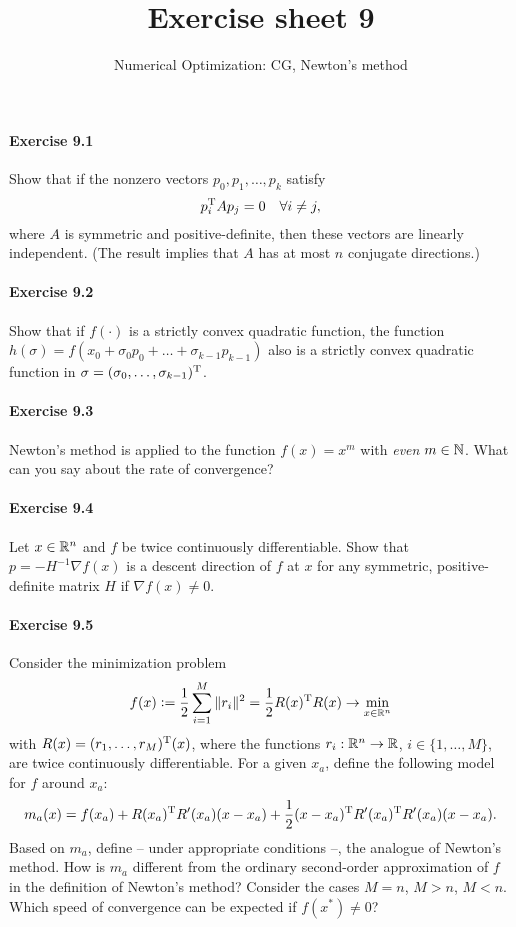 
\title{Exercise sheet 9}
\subtitle{Numerical Optimization: CG, Newton's method}

\maketitle

\paragraph{Exercise 9.1}  %
Show that if the nonzero vectors $p_0, p_1,\dots, p_k$ satisfy
\[
  p_i^{\text{\upshape T}} A p_j = 0 \quad\forall i\neq j,
\]
where $A$ is symmetric and positive-definite, then these vectors are linearly
independent. (The result implies that $A$ has at most $n$ conjugate
directions.)

\paragraph{Exercise 9.2}  %
Show that if $f(\cdot)$ is a strictly convex quadratic function, the function
$h(\sigma)=f(x_0+\sigma_0 p_0 + \dots +\sigma_{k-1}p_{k-1})$ also is a strictly
convex quadratic function in $\sigma=(\sigma_0,\dots,\sigma_{k-1})^{\text{\upshape T}}$.

\paragraph{Exercise 9.3}
Newton's method is applied to the function $f(x)=x^m$ with \emph{even}
$m\in\mathbb{N}$. What can you say about the rate of convergence?

\paragraph{Exercise 9.4}
Let $x \in \mathbb{R}^n$ and $f$ be twice continuously differentiable. Show that $p =
-H^{-1}\nabla f(x)$ is a descent direction of $f$ at $x$ for any
symmetric, positive-definite matrix $H$ if $\nabla f(x) \neq 0$.

\paragraph{Exercise 9.5}
Consider the minimization problem
\[
  f(x)\mathrel{\mathop:}= \frac{1}{2}\sum_{i=1}^M\|r_i\|^2 = \frac{1}{2}R(x)^{\text{\upshape T}} R(x) \to \min_{x\in\mathbb{R}^n}
\]
with $R(x)=(r_1,\dots,r_M)^{\text{\upshape T}}(x)$, where the functions $r_i:\mathbb{R}^n\to\mathbb{R}$, $i\in\{1,\dots,M\}$, are twice continuously differentiable. For a given $x_a$, define the following model for $f$ around $x_a$:
\[
  m_a(x) = f(x_a)
         + R(x_a)^{\text{\upshape T}} R'(x_a)(x-x_a)
         + \frac{1}{2} (x-x_a)^{\text{\upshape T}} R'(x_a)^{\text{\upshape T}} R'(x_a)(x-x_a).
\]
Based on $m_a$, define -- under appropriate conditions --, the analogue of
Newton's method. How is $m_a$ different from the ordinary second-order
approximation of $f$ in the definition of Newton's method? Consider the cases
$M=n$, $M>n$, $M<n$. Which speed of convergence can be expected if $f(x^*)\neq 0$?

